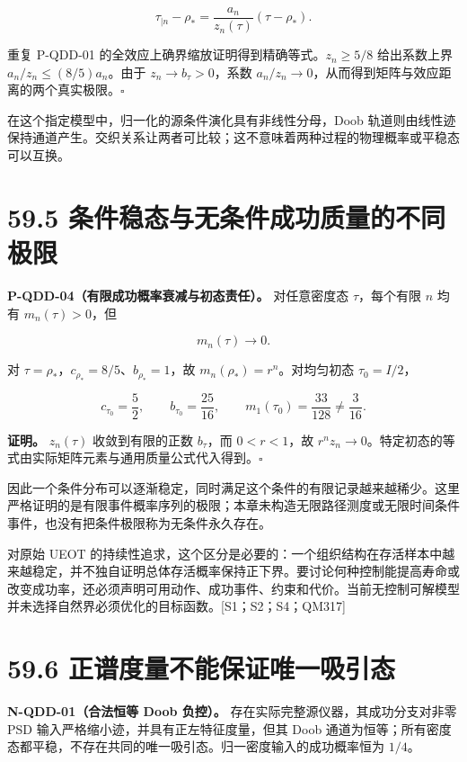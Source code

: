 \documentclass[
  11pt,
  oneside]{book}
\begin{document}
\[
\tau_{\mid n}-\rho_*
=\frac{a_n}{z_n(\tau)}(\tau-\rho_*).
\]

重复 P-QDD-01 的全效应上确界缩放证明得到精确等式。\(z_n\ge5/8\)
给出系数上界 \(a_n/z_n\le(8/5)a_n\)。由于 \(z_n\to b_\tau>0\)，系数
\(a_n/z_n\to0\)，从而得到矩阵与效应距离的两个真实极限。\(\square\)

在这个指定模型中，归一化的源条件演化具有非线性分母，Doob
轨道则由线性迹保持通道产生。交织关系让两者可比较；这不意味着两种过程的物理概率或平稳态可以互换。

\section{59.5 条件稳态与无条件成功质量的不同极限}

\protect\hypertarget{p-qdd-04}{}{}

\textbf{P-QDD-04（有限成功概率衰减与初态责任）。} 对任意密度态
\(\tau\)，每个有限 \(n\) 均有 \(m_n(\tau)>0\)，但

\[
m_n(\tau)\longrightarrow0.
\]

对 \(\tau=\rho_*\)，\(c_{\rho_*}=8/5\)、\(b_{\rho_*}=1\)，故
\(m_n(\rho_*)=r^n\)。对均匀初态 \(\tau_0=I/2\)，

\[
c_{\tau_0}=\frac52,\qquad b_{\tau_0}=\frac{25}{16},\qquad
m_1(\tau_0)=\frac{33}{128}\ne\frac3{16}.
\]

\textbf{证明。} \(z_n(\tau)\) 收敛到有限的正数 \(b_\tau\)，而
\(0<r<1\)，故
\(r^nz_n\to0\)。特定初态的等式由实际矩阵元素与通用质量公式代入得到。\(\square\)

因此一个条件分布可以逐渐稳定，同时满足这个条件的有限记录越来越稀少。这里严格证明的是有限事件概率序列的极限；本章未构造无限路径测度或无限时间条件事件，也没有把条件极限称为无条件永久存在。

对原始 UEOT
的持续性追求，这个区分是必要的：一个组织结构在存活样本中越来越稳定，并不独自证明总体存活概率保持正下界。要讨论何种控制能提高寿命或改变成功率，还必须声明可用动作、成功事件、约束和代价。当前无控制可解模型并未选择自然界必须优化的目标函数。{[}S1；S2；S4；QM317{]}

\section{59.6 正谱度量不能保证唯一吸引态}

\protect\hypertarget{n-qdd-01}{}{}

\textbf{N-QDD-01（合法恒等 Doob 负控）。}
存在实际完整源仪器，其成功分支对非零 PSD
输入严格缩小迹，并具有正左特征度量，但其 Doob
通道为恒等；所有密度态都平稳，不存在共同的唯一吸引态。归一密度输入的成功概率恒为
\(1/4\)。
\end{document}
